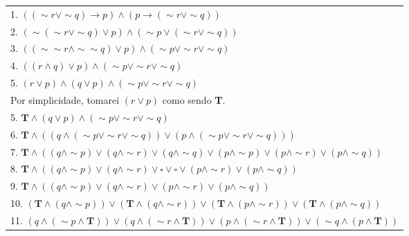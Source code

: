 \documentclass[12pt, a4paper,final]{article}
\begin{document}
\begin{enumerate}
\begin{enumerate}[label=(\alph*), leftmargin = 5mm]
                \begin{tabular}{l}
                    1. $((\sim r \vee \sim q) \rightarrow p) \wedge (p \rightarrow (\sim r \vee \sim q))$\\ %
                    2. $(\sim (\sim r \vee \sim q) \vee p) \wedge (\sim p \vee (\sim r \vee \sim q))$\\ %
                    3. $((\sim \sim r \wedge \sim \sim q) \vee p) \wedge (\sim p \vee \sim r \vee \sim q)$\\ %
                    4. $((r \wedge q) \vee p) \wedge (\sim p \vee \sim r \vee \sim q)$\\ %
                    5. $(r \vee p) \wedge (q \vee p) \wedge (\sim p \vee \sim r \vee \sim q)$\\ %
                    Por simplicidade, tomarei $(r \vee p)$ como sendo \textbf{T}.\\
                    5. $\textbf{T} \wedge (q \vee p) \wedge (\sim p \vee \sim r \vee \sim q)$\\ %
                    6. $\textbf{T} \wedge ((q \wedge (\sim p \vee \sim r \vee \sim q)) \vee (p \wedge (\sim p \vee \sim r \vee \sim q)))$\\ %
                    7. $\textbf{T} \wedge ((q \wedge \sim p) \vee (q \wedge \sim r) \vee (q \wedge \sim q) \vee (p \wedge \sim p) \vee (p \wedge \sim r) \vee (p \wedge \sim q))$\\%
                    8. $\textbf{T} \wedge ((q \wedge \sim p) \vee (q \wedge \sim r) \vee \square \vee \square \vee (p \wedge \sim r) \vee (p \wedge \sim q))$\\ %
                    9. $\textbf{T} \wedge ((q \wedge \sim p) \vee (q \wedge \sim r) \vee (p \wedge \sim r) \vee (p \wedge \sim q))$\\ %
                    10. $(\textbf{T} \wedge (q \wedge \sim p)) \vee (\textbf{T} \wedge (q \wedge \sim r)) \vee (\textbf{T} \wedge (p \wedge \sim r)) \vee (\textbf{T} \wedge (p \wedge \sim q))$\\ %
                    11. $(q \wedge (\sim p \wedge \textbf{T})) \vee (q \wedge (\sim r \wedge \textbf{T})) \vee (p \wedge (\sim r \wedge \textbf{T})) \vee (\sim q \wedge (p \wedge \textbf{T}))$\\ %

\end{tabular}
\end{enumerate}
\end{enumerate}
\end{document}
